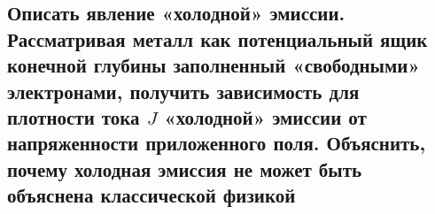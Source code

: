 \subsection{Описать явление «холодной» эмиссии. Рассматривая металл как потенциальный ящик
конечной глубины заполненный «свободными» электронами, получить зависимость для плотности
тока $J$ «холодной» эмиссии от напряженности приложенного поля. Объяснить, почему холодная
эмиссия не может быть объяснена классической физикой}


